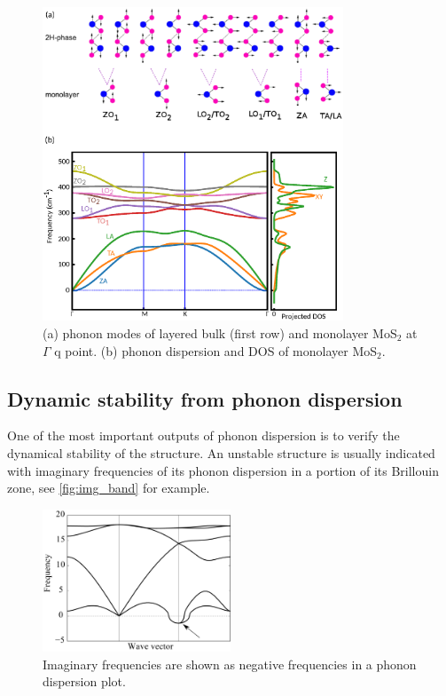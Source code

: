 \begin{figure}[htbp!] 
\centering  
\includegraphics[width=0.8\textwidth]{ph_mos2.eps}
\caption{(a) phonon modes of layered bulk (first row) and monolayer MoS$_2$ at $\Gamma$ q point. (b) phonon dispersion and DOS of monolayer MoS$_2$.}  
\label{fig:mos2_ph}
\end{figure} 


\subsection{Dynamic stability from phonon dispersion}

One of the most important outputs of phonon dispersion is to verify the dynamical stability of the structure. An unstable structure is usually indicated with imaginary frequencies of its phonon dispersion in a portion of its Brillouin zone, see \autoref{fig:img_band} for example. 


\begin{figure}[htbp!] 
\centering  
\includegraphics[width=0.5\textwidth]{img_band.png}
\caption{ Imaginary frequencies are shown as negative frequencies in a phonon dispersion plot.}  
\label{fig:img_band}
\end{figure} 

